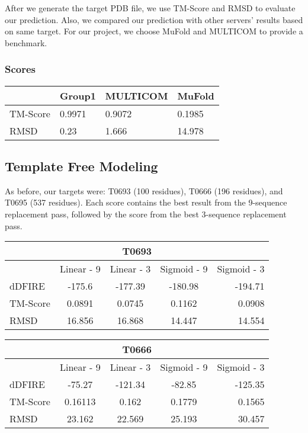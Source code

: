 \documentclass{article}
\begin{document}
After we generate the target PDB file, we use TM-Score and RMSD to evaluate our prediction. Also, we compared our prediction with other servers' results based on same target. For our project, we choose MuFold and MULTICOM to provide a benchmark.


\begin{center}
	\subsubsection*{Scores}
    \begin{tabular}{ | l | l | l | p{2cm} |}
    \hline
      & Group1 & MULTICOM & MuFold \\ \hline
    TM-Score & 0.9971 & 0.9072 & 0.1985 \\ \hline
    RMSD & 0.23 & 1.666 & 14.978 \\
    \hline
    \end{tabular}
\end{center}


\subsection{Template Free Modeling}

As before, our targets were: T0693 (100 residues), T0666 (196 residues), and T0695 (537 residues).  Each score contains the best result from the 9-sequence replacement pass, followed by the score from the best 3-sequence replacement pass.

\begin{center}
\begin{tabular}{|l|c|c|c|r|}
\multicolumn{5}{c}{T0693} \\
    \hline
      & Linear - 9 & Linear - 3 & Sigmoid - 9 & Sigmoid - 3\\ \hline
    dDFIRE & -175.6 & -177.39 & -180.98 & -194.71 \\ \hline
    TM-Score & 0.0891 & 0.0745 & 0.1162 & 0.0908 \\ \hline
    RMSD & 16.856 & 16.868 & 14.447 & 14.554 \\
    \hline
    \end{tabular}
\end{center}

\begin{center}
\begin{tabular}{|l|c|c|c|r|}
\multicolumn{5}{c}{T0666} \\
    \hline
      & Linear - 9 & Linear - 3 & Sigmoid - 9 & Sigmoid - 3\\ \hline
    dDFIRE & -75.27 & -121.34 & -82.85 & -125.35 \\ \hline
    TM-Score & 0.16113 & 0.162 & 0.1779 & 0.1565 \\ \hline
    RMSD & 23.162 & 22.569 & 25.193 & 30.457 \\
    \hline
    \end{tabular}
\end{center}
\end{document}
